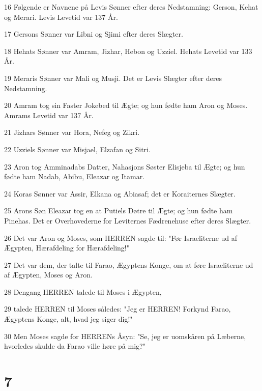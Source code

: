 \par 16 Følgende er Navnene på Levis Sønner efter deres Nedstamning: Gerson, Kehat og Merari. Levis Levetid var 137 År.
\par 17 Gersons Sønner var Libni og Sjimi efter deres Slægter.
\par 18 Hehats Sønner var Amram, Jizhar, Hebon og Uzziel. Hehats Levetid var 133 År.
\par 19 Meraris Sønner var Mali og Musji. Det er Levis Slægter efter deres Nedstamning.
\par 20 Amram tog sin Faster Jokebed til Ægte; og hun fødte ham Aron og Moses. Amrams Levetid var 137 År.
\par 21 Jizhars Sønner var Hora, Nefeg og Zikri.
\par 22 Uzziels Sønner var Misjael, Elzafan og Sitri.
\par 23 Aron tog Amminadabs Datter, Nahasjons Søster Elisjeba til Ægte; og hun fødte ham Nadab, Abibu, Eleazar og Itamar.
\par 24 Koras Sønner var Assir, Elkana og Abiasaf; det er Koraiternes Slægter.
\par 25 Arons Søn Eleazar tog en at Putiels Døtre til Ægte; og hun fødte ham Pinehas. Det er Overhovederne for Leviternes Fædrenehuse efter deres Slægter.
\par 26 Det var Aron og Moses, som HERREN sagde til: "Før Israeliterne ud af Ægypten, Hærafdeling for Hærafdeling!"
\par 27 Det var dem, der talte til Farao, Ægyptens Konge, om at føre Israeliterne ud af Ægypten, Moses og Aron.
\par 28 Dengang HERREN talede til Moses i Ægypten,
\par 29 talede HERREN til Moses således: "Jeg er HERREN! Forkynd Farao, Ægyptens Konge, alt, hvad jeg siger dig!"
\par 30 Men Moses sagde for HERRENs Åsyn: "Se, jeg er uomskåren på Læberne, hvorledes skulde da Farao ville høre på mig?"

\chapter{7}

